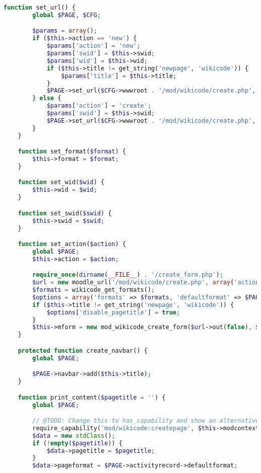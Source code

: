 \begin{lstlisting}[language=PHP]
    function set_url() {
        global $PAGE, $CFG;

        $params = array();
        if ($this->action == 'new') {
            $params['action'] = 'new';
            $params['swid'] = $this->swid;
            $params['wid'] = $this->wid;
            if ($this->title != get_string('newpage', 'wikicode')) {
                $params['title'] = $this->title;
            }
            $PAGE->set_url($CFG->wwwroot . '/mod/wikicode/create.php', $params);
        } else {
            $params['action'] = 'create';
            $params['swid'] = $this->swid;
            $PAGE->set_url($CFG->wwwroot . '/mod/wikicode/create.php', $params);
        }
    }

    function set_format($format) {
        $this->format = $format;
    }

    function set_wid($wid) {
        $this->wid = $wid;
    }

    function set_swid($swid) {
        $this->swid = $swid;
    }

    function set_action($action) {
        global $PAGE;
        $this->action = $action;

        require_once(dirname(__FILE__) . '/create_form.php');
        $url = new moodle_url('/mod/wikicode/create.php', array('action' => 'create', 'wid' => $PAGE->activityrecord->id, 'gid' => $this->gid, 'uid' => $this->uid));
        $formats = wikicode_get_formats();
        $options = array('formats' => $formats, 'defaultformat' => $PAGE->activityrecord->defaultformat, 'forceformat' => $PAGE->activityrecord->forceformat);
        if ($this->title != get_string('newpage', 'wikicode')) {
            $options['disable_pagetitle'] = true;
        }
        $this->mform = new mod_wikicode_create_form($url->out(false), $options);
    }

    protected function create_navbar() {
        global $PAGE;

        $PAGE->navbar->add($this->title);
    }

    function print_content($pagetitle = '') {
        global $PAGE;

        // @TODO: Change this to has_capability and show an alternative interface.
        require_capability('mod/wikicode:createpage', $this->modcontext, NULL, true, 'nocreatepermission', 'wikicode');
        $data = new stdClass();
        if (!empty($pagetitle)) {
            $data->pagetitle = $pagetitle;
        }
        $data->pageformat = $PAGE->activityrecord->defaultformat;


\end{lstlisting}
